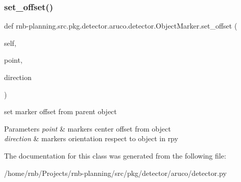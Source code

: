 \subsubsection{\texorpdfstring{set\+\_\+offset()}{set\_offset()}}
{\footnotesize\ttfamily def rnb-\/planning.\+src.\+pkg.\+detector.\+aruco.\+detector.\+Object\+Marker.\+set\+\_\+offset (\begin{DoxyParamCaption}\item[{}]{self,  }\item[{}]{point,  }\item[{}]{direction }\end{DoxyParamCaption})}



set marker offset from parent object 


\begin{DoxyParams}{Parameters}
{\em point} & marker\textquotesingle{}s center offset from object \\
\hline
{\em direction} & marker\textquotesingle{}s orientation respect to object in rpy \\
\hline
\end{DoxyParams}


The documentation for this class was generated from the following file\+:\begin{DoxyCompactItemize}
\item 
/home/rnb/\+Projects/rnb-\/planning/src/pkg/detector/aruco/detector.\+py\end{DoxyCompactItemize}
